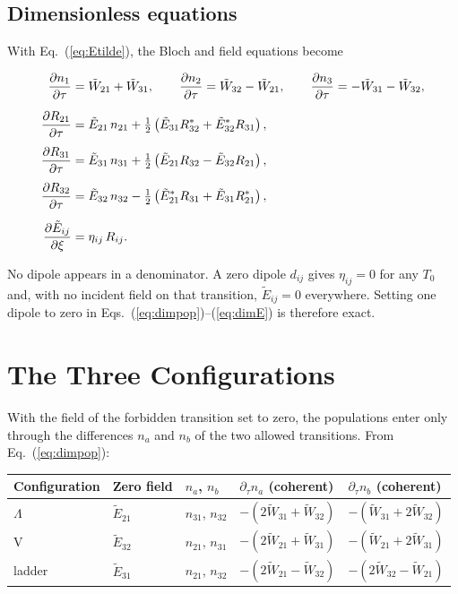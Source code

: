 \documentclass[12pt,a4paper]{article}
\newcommand{\T}{T_0}
\newcommand{\tE}{\tilde{E}}
\newcommand{\tW}{\tilde{W}}
\begin{document}
\subsection{Dimensionless equations}

With Eq.~(\ref{eq:Etilde}), the Bloch and field equations become

\begin{resultbox}
\begin{align}
  \pderiv{n_1}{\tau} &= \tW_{21} + \tW_{31}, \qquad
  \pderiv{n_2}{\tau} = \tW_{32} - \tW_{21}, \qquad
  \pderiv{n_3}{\tau} = -\tW_{31} - \tW_{32},
  \label{eq:dimpop}\\[6pt]
  \pderiv{R_{21}}{\tau} &= \tE_{21}\,n_{21}
     + \tfrac12\left(\tE_{31}R_{32}^* + \tE_{32}^*R_{31}\right),
  \label{eq:dimR21}\\[4pt]
  \pderiv{R_{31}}{\tau} &= \tE_{31}\,n_{31}
     + \tfrac12\left(\tE_{21}R_{32} - \tE_{32}R_{21}\right),
  \label{eq:dimR31}\\[4pt]
  \pderiv{R_{32}}{\tau} &= \tE_{32}\,n_{32}
     - \tfrac12\left(\tE_{21}^*R_{31} + \tE_{31}R_{21}^*\right),
  \label{eq:dimR32}\\[6pt]
  \pderiv{\tE_{ij}}{\xi} &= \eta_{ij}\,R_{ij}.
  \label{eq:dimE}
\end{align}
\end{resultbox}

\begin{notebox}
  No dipole appears in a denominator. A zero dipole $d_{ij}$ gives
  $\eta_{ij} = 0$ for any $\T$ and, with no incident field on that transition,
  $\tE_{ij} = 0$ everywhere. Setting one dipole to zero in
  Eqs.~(\ref{eq:dimpop})--(\ref{eq:dimE}) is therefore exact.
\end{notebox}

\section{The Three Configurations}
\label{sec:configs}

With the field of the forbidden transition set to zero, the populations enter
only through the differences $n_a$ and $n_b$ of the two allowed transitions.
From Eq.~(\ref{eq:dimpop}):
\begin{center}
\begin{tabular}{@{}lllll@{}}
  \toprule
  Configuration & Zero field & $n_a$, $n_b$ & $\partial_\tau n_a$ (coherent) & $\partial_\tau n_b$ (coherent) \\
  \midrule
  $\Lambda$ & $\tE_{21}$ & $n_{31}$, $n_{32}$ & $-(2\tW_{31} + \tW_{32})$ & $-(\tW_{31} + 2\tW_{32})$ \\
  V         & $\tE_{32}$ & $n_{21}$, $n_{31}$ & $-(2\tW_{21} + \tW_{31})$ & $-(\tW_{21} + 2\tW_{31})$ \\
  ladder    & $\tE_{31}$ & $n_{21}$, $n_{32}$ & $-(2\tW_{21} - \tW_{32})$ & $-(2\tW_{32} - \tW_{21})$ \\
  \bottomrule
\end{tabular}
\end{center}
\end{document}
